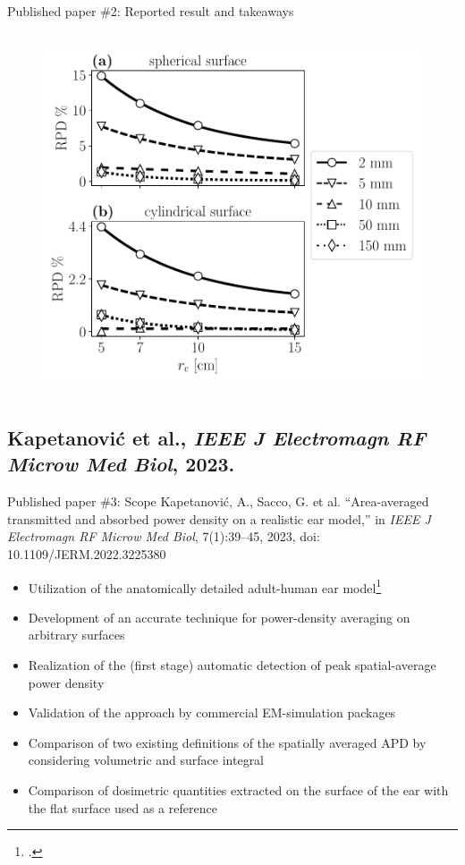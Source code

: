\documentclass[xcolor=dvipsnames,10pt]{beamer}
\begin{document}
\begin{frame}{Published paper \#2: Reported result and takeaways}
\begin{onlyenv}
\begin{columns}[c]
\begin{column}{0.5\textwidth}
\begin{center}
\begin{figure}
                        \includegraphics[width=\textwidth]{artwork/RPD-exponential.pdf}
                \end{figure}
                \end{center}
            \end{column}
        \end{columns}  
    \end{onlyenv}
\end{frame}

\subsection{Kapetanović et al., \textit{IEEE J Electromagn RF Microw Med Biol}, 2023.}
\begin{frame}{Published paper \#3: Scope}
    Kapetanović, A., Sacco, G. et al. ``Area-averaged transmitted and absorbed power density on a realistic ear model,'' in \textit{IEEE J Electromagn RF Microw Med Biol}, 7(1):39--45, 2023, doi: 10.1109/JERM.2022.3225380
    \begin{itemize}
        \item Utilization of the anatomically detailed adult-human ear model\footcite{Sforza2009Age}
        \item Development of an accurate technique for power-density averaging on arbitrary surfaces
        \item Realization of the (first stage) automatic detection of peak spatial-average power density
        \item Validation of the approach by commercial EM-simulation packages
        \item Comparison of two existing definitions of the spatially averaged APD by considering volumetric and surface integral
        \item Comparison of dosimetric quantities extracted on the surface of the ear with the flat surface used as a reference
    \end{itemize}
\end{frame}
\end{document}
